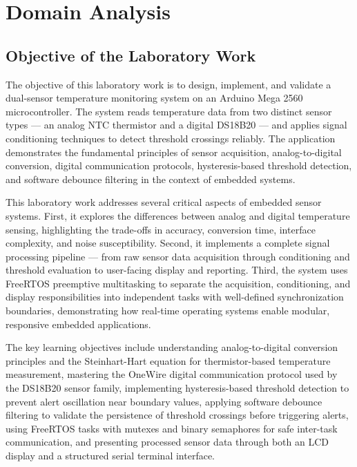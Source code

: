 \section{Domain Analysis}

\subsection{Objective of the Laboratory Work}

The objective of this laboratory work is to design, implement, and validate a dual-sensor temperature monitoring system on an Arduino Mega 2560 microcontroller. The system reads temperature data from two distinct sensor types --- an analog NTC thermistor and a digital DS18B20 --- and applies signal conditioning techniques to detect threshold crossings reliably. The application demonstrates the fundamental principles of sensor acquisition, analog-to-digital conversion, digital communication protocols, hysteresis-based threshold detection, and software debounce filtering in the context of embedded systems.

This laboratory work addresses several critical aspects of embedded sensor systems. First, it explores the differences between analog and digital temperature sensing, highlighting the trade-offs in accuracy, conversion time, interface complexity, and noise susceptibility. Second, it implements a complete signal processing pipeline --- from raw sensor data acquisition through conditioning and threshold evaluation to user-facing display and reporting. Third, the system uses FreeRTOS preemptive multitasking to separate the acquisition, conditioning, and display responsibilities into independent tasks with well-defined synchronization boundaries, demonstrating how real-time operating systems enable modular, responsive embedded applications.

The key learning objectives include understanding analog-to-digital conversion principles and the Steinhart-Hart equation for thermistor-based temperature measurement, mastering the OneWire digital communication protocol used by the DS18B20 sensor family, implementing hysteresis-based threshold detection to prevent alert oscillation near boundary values, applying software debounce filtering to validate the persistence of threshold crossings before triggering alerts, using FreeRTOS tasks with mutexes and binary semaphores for safe inter-task communication, and presenting processed sensor data through both an LCD display and a structured serial terminal interface.

